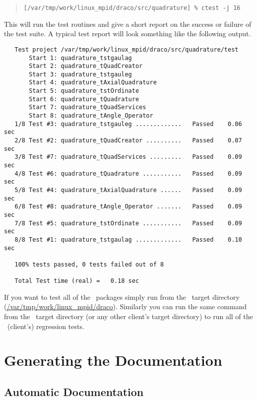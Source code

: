 \footnotesize
\begin{verse}
\texttt{[/var/tmp/work/linux\_mpid/draco/src/quadrature] \% ctest -j 16}
\end{verse}
\normalsize

This will run the test routines and give a short report on the success
or failure of the test suite.  A typical test report will look something
like the following output.

\footnotesize
\begin{verbatim}
   Test project /var/tmp/work/linux_mpid/draco/src/quadrature/test
       Start 1: quadrature_tstgaulag
       Start 2: quadrature_tQuadCreator
       Start 3: quadrature_tstgauleg
       Start 4: quadrature_tAxialQuadrature
       Start 5: quadrature_tstOrdinate
       Start 6: quadrature_tQuadrature
       Start 7: quadrature_tQuadServices
       Start 8: quadrature_tAngle_Operator
   1/8 Test #3: quadrature_tstgauleg .............   Passed    0.06 sec
   2/8 Test #2: quadrature_tQuadCreator ..........   Passed    0.07 sec
   3/8 Test #7: quadrature_tQuadServices .........   Passed    0.09 sec
   4/8 Test #6: quadrature_tQuadrature ...........   Passed    0.09 sec
   5/8 Test #4: quadrature_tAxialQuadrature ......   Passed    0.09 sec
   6/8 Test #8: quadrature_tAngle_Operator .......   Passed    0.09 sec
   7/8 Test #5: quadrature_tstOrdinate ...........   Passed    0.09 sec
   8/8 Test #1: quadrature_tstgaulag .............   Passed    0.10 sec
   
   100% tests passed, 0 tests failed out of 8
   
   Total Test time (real) =   0.18 sec
\end{verbatim}
\normalsize

If you want to test all of the \draco\ packages simply run
 from the \draco\ target directory
(\url{/var/tmp/work/linux_mpid/draco}).  Similarly you can run the
same command from the \capsaicin\ target directory (or any other
client's target directory) to run all of the \capsaicin\ (client's)
regression tests.


\section{Generating the Documentation}

\subsection{Automatic Documentation}

